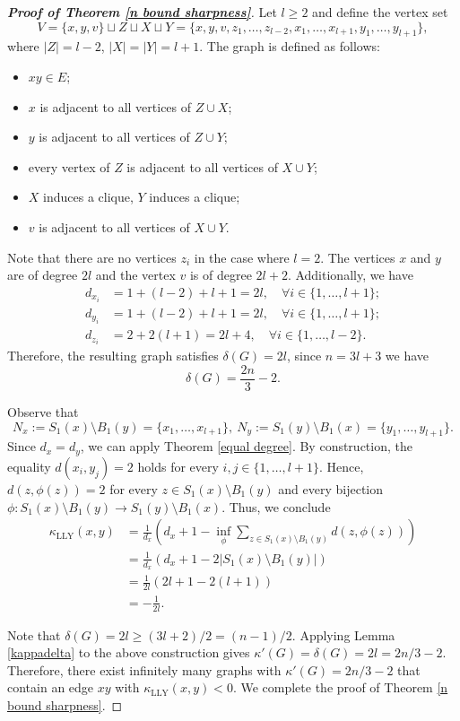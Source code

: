 \documentclass[10pt,a4paper]{article}
\theoremstyle{definition}
\theoremstyle{definition}
\theoremstyle{nonumber}
\begin{document}
\begin{proof}[\bf{Proof of Theorem \ref{n bound sharpness}}]
Let $l\geq2$ and define the vertex set
$$
V =\{x,y,v\}\sqcup Z \sqcup X \sqcup Y = \{x, y, v, z_1, \dots, z_{l-2}, x_1, \dots, x_{l+1}, y_1, \dots, y_{l+1}\},
$$
where $|Z|=l-2$, $|X|=|Y|=l+1$.
The graph is defined as follows:
\begin{itemize}
\item $xy\in E$;
\item $x$ is adjacent to all vertices of $Z\cup X$;
\item $y$ is adjacent to all vertices of $Z\cup Y$;
\item every vertex of $Z$ is adjacent to all vertices of $X\cup Y$;
\item $X$ induces a clique, $Y$ induces a clique;
\item $v$ is adjacent to all vertices of $X\cup Y$.
\end{itemize}
Note that there are no vertices $z_i$ in the case where $l = 2$. The vertices $x$ and $y$ are of degree $2l$ and the vertex $v$ is of degree $2l+2$.
Additionally, we have
\begin{align*}
d_{x_i} &= 1 + (l - 2) + l  + 1 = 2l,\quad \forall i \in \{1, \dots, l+1\};\\
d_{y_i} &= 1 + (l - 2) + l  + 1 = 2l,\quad \forall i \in \{1, \dots, l+1\};\\
d_{z_i} &= 2 + 2(l+1) = 2l + 4,\quad \forall i \in \{1, \dots, l-2\}.
\end{align*}
Therefore, the resulting graph satisfies $\delta(G) = 2l$, since $n = 3l + 3$ we have
$$
\delta(G) = \frac{2n}{3} - 2.
$$

Observe that
$$N_x:=S_1(x) \setminus B_1(y) = \{x_1, \dots, x_{l+1}\},\
N_y:=S_1(y) \setminus B_1(x) = \{y_1, \dots, y_{l+1}\}.$$
Since $d_x = d_y$, we can apply Theorem \ref{equal degree}. By construction, the equality $d(x_i, y_j) = 2$ holds for every $i, j \in \{1, \dots, l+1\}$. Hence, $d(z, \phi(z)) = 2$ for every $z \in S_1(x) \setminus B_1(y)$ and every bijection $\phi : S_1(x) \setminus B_1(y) \to S_1(y) \setminus B_1(x)$. Thus, we conclude
\begin{align*}
\kappa_{\mathrm{LLY}}(x, y) &= \frac{1}{d_x} \left( d_x + 1 - \inf_{\phi} \sum_{z \in S_1(x) \setminus B_1(y)} d(z, \phi(z)) \right)\\
&= \frac{1}{d_x} \left( d_x + 1 - 2|S_1(x) \setminus B_1(y)| \right)\\
&= \frac{1}{2l} \left( 2l + 1 - 2 \left( l + 1 \right) \right)\\
&=  -\frac{1}{2l}.
\end{align*}

Note that $\delta(G)=2l\geq(3l+2)/2=(n-1)/2.$
Applying Lemma \ref{kappadelta} to the above construction gives
$\kappa'(G)=\delta(G)=2l=2n/3-2.$
Therefore, there exist infinitely many graphs with $\kappa'(G)=2n/3-2$ that contain an edge $xy$ with $\kappa_{\mathrm{LLY}}(x, y) < 0$.
We complete the proof of Theorem \ref{n bound sharpness}.
\end{proof}
\end{document}
